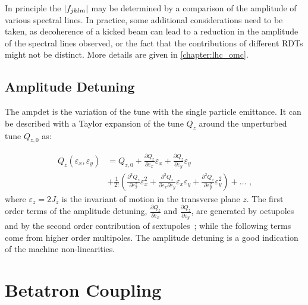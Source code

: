 In principle the \(\left\lvert f_{jklm} \right\rvert\) may be determined by a comparison of the amplitude of various spectral lines.
In practice, some additional considerations need to be taken, as decoherence of a kicked beam can lead to a reduction in the amplitude of the spectral lines observed, or the fact that the contributions of different \glspl{RDT} might not be distinct.
More details are given in \cref{chapter:lhc_omc}.

\subsection{Amplitude Detuning}
\label{subsection:amplitude_detuning}

The \gls{ampdet} is the variation of the \gls{tune} with the single particle emittance.
It can be described with a Taylor expansion of the tune \(Q_z\) around the unperturbed tune \(Q_{z, 0}\) as:

\begin{equation}
    \begin{aligned}
    Q_z \left( \varepsilon_x, \varepsilon_y \right) & = Q_{z, 0} + \frac{\partial Q_z}{\partial \varepsilon_x} \varepsilon_x + \frac{\partial Q_z}{\partial \varepsilon_y} \varepsilon_y \\
                                                    & + \frac{1}{2!} \left(\frac{\partial^2 Q_z}{\partial \varepsilon_x^2} \varepsilon_x^2 + \frac{\partial^2 Q_z}{\partial \varepsilon_x \partial \varepsilon_y} \varepsilon_x \varepsilon_y + \frac{\partial^2 Q_z}{\partial \varepsilon_y^2} \varepsilon_y^2 \right) + \ldots \text{ ,}
    \end{aligned}
    \label{equation:tune_taylor_expansion}
\end{equation}
where \(\varepsilon_z = 2 J_z\) is the invariant of motion in the transverse plane \(z\).
The first order terms of the amplitude detuning, \(\frac{\partial Q_z}{\partial \varepsilon_x}\) and \(\frac{\partial Q_z}{\partial \varepsilon_y}\), are generated by octupoles and by the second order contribution of sextupoles~\cite{BOOK:Bazzani:Normal_Form_Approach_Betatron_Motion}; while the following terms come from higher order multipoles.
The amplitude detuning is a good indication of the machine non-linearities.

\section{Betatron Coupling}
\label{section:betatron_coupling}

